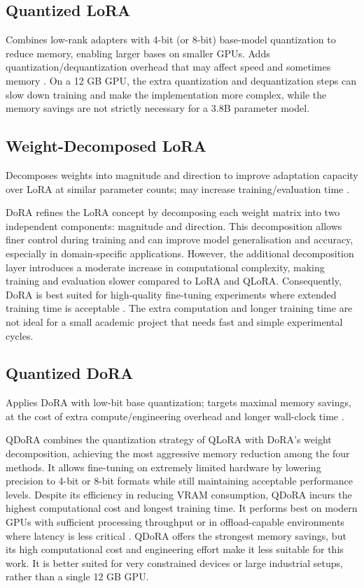 \subsection{Quantized LoRA}

Combines low-rank adapters with 4-bit (or 8-bit) base-model quantization to reduce memory, enabling larger bases on smaller GPUs. Adds quantization/dequantization overhead that may affect speed and sometimes memory \parencite{FineTuni58:online, QLoRAEff12:online}. On a 12 GB GPU, the extra quantization and dequantization steps can slow down training and make the implementation more complex, while the memory savings are not strictly necessary for a 3.8B parameter model.


\subsection{Weight-Decomposed LoRA}

Decomposes weights into magnitude and direction to improve adaptation capacity over LoRA at similar parameter counts; may increase training/evaluation time \parencite{FineTuni58:online}.

DoRA refines the LoRA concept by decomposing each weight matrix into two independent components: magnitude and direction. This decomposition allows finer control during training and can improve model generalisation and accuracy, especially in domain-specific applications. However, the additional decomposition layer introduces a moderate increase in computational complexity, making training and evaluation slower compared to LoRA and QLoRA. Consequently, DoRA is best suited for high-quality fine-tuning experiments where extended training time is acceptable \parencite{FineTuni58:online}. The extra computation and longer training time are not ideal for a small academic project that needs fast and simple experimental cycles.


\subsection{Quantized DoRA}

Applies DoRA with low-bit base quantization; targets maximal memory savings, at the cost of extra compute/engineering overhead and longer wall-clock time \parencite{FineTuni58:online}.

QDoRA combines the quantization strategy of QLoRA with DoRA’s weight decomposition, achieving the most aggressive memory reduction among the four methods. It allows fine-tuning on extremely limited hardware by lowering precision to 4-bit or 8-bit formats while still maintaining acceptable performance levels. Despite its efficiency in reducing VRAM consumption, QDoRA incurs the highest computational cost and longest training time. It performs best on modern GPUs with sufficient processing throughput or in offload-capable environments where latency is less critical \parencite{FineTuni58:online}. QDoRA offers the strongest memory savings, but its high computational cost and engineering effort make it less suitable for this work. It is better suited for very constrained devices or large industrial setups, rather than a single 12 GB GPU.


